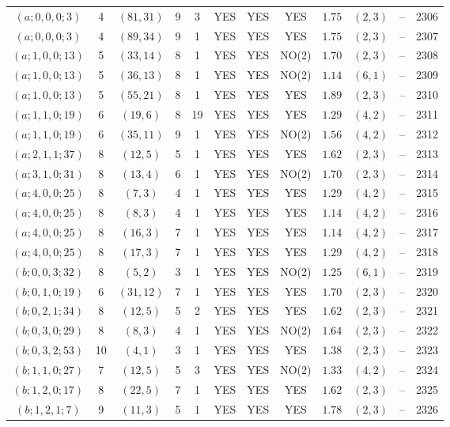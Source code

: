 \begin{longtable}{|c|c|c|c|c|c|c|c|c|c|c|c|}
$(a;0,0,0;3)$ & 4 & $(81,31)$ & 9 & 3 & YES & YES & YES & $1.75$ & $(2,3)$ & -- & 2306\\
$(a;0,0,0;3)$ & 4 & $(89,34)$ & 9 & 1 & YES & YES & YES & $1.75$ & $(2,3)$ & -- & 2307\\
$(a;1,0,0;13)$ & 5 & $(33,14)$ & 8 & 1 & YES & YES & NO(2) & $1.70$ & $(2,3)$ & -- & 2308\\
$(a;1,0,0;13)$ & 5 & $(36,13)$ & 8 & 1 & YES & YES & NO(2) & $1.14$ & $(6,1)$ & -- & 2309\\
$(a;1,0,0;13)$ & 5 & $(55,21)$ & 8 & 1 & YES & YES & YES & $1.89$ & $(2,3)$ & -- & 2310\\
$(a;1,1,0;19)$ & 6 & $(19,6)$ & 8 & 19 & YES & YES & YES & $1.29$ & $(4,2)$ & -- & 2311\\
$(a;1,1,0;19)$ & 6 & $(35,11)$ & 9 & 1 & YES & YES & NO(2) & $1.56$ & $(4,2)$ & -- & 2312\\
$(a;2,1,1;37)$ & 8 & $(12,5)$ & 5 & 1 & YES & YES & YES & $1.62$ & $(2,3)$ & -- & 2313\\
$(a;3,1,0;31)$ & 8 & $(13,4)$ & 6 & 1 & YES & YES & NO(2) & $1.70$ & $(2,3)$ & -- & 2314\\
$(a;4,0,0;25)$ & 8 & $(7,3)$ & 4 & 1 & YES & YES & YES & $1.29$ & $(4,2)$ & -- & 2315\\
$(a;4,0,0;25)$ & 8 & $(8,3)$ & 4 & 1 & YES & YES & YES & $1.14$ & $(4,2)$ & -- & 2316\\
$(a;4,0,0;25)$ & 8 & $(16,3)$ & 7 & 1 & YES & YES & YES & $1.14$ & $(4,2)$ & -- & 2317\\
$(a;4,0,0;25)$ & 8 & $(17,3)$ & 7 & 1 & YES & YES & YES & $1.29$ & $(4,2)$ & -- & 2318\\
$(b;0,0,3;32)$ & 8 & $(5,2)$ & 3 & 1 & YES & YES & NO(2) & $1.25$ & $(6,1)$ & -- & 2319\\
$(b;0,1,0;19)$ & 6 & $(31,12)$ & 7 & 1 & YES & YES & YES & $1.70$ & $(2,3)$ & -- & 2320\\
$(b;0,2,1;34)$ & 8 & $(12,5)$ & 5 & 2 & YES & YES & YES & $1.62$ & $(2,3)$ & -- & 2321\\
$(b;0,3,0;29)$ & 8 & $(8,3)$ & 4 & 1 & YES & YES & NO(2) & $1.64$ & $(2,3)$ & -- & 2322\\
$(b;0,3,2;53)$ & 10 & $(4,1)$ & 3 & 1 & YES & YES & YES & $1.38$ & $(2,3)$ & -- & 2323\\
$(b;1,1,0;27)$ & 7 & $(12,5)$ & 5 & 3 & YES & YES & NO(2) & $1.33$ & $(4,2)$ & -- & 2324\\
$(b;1,2,0;17)$ & 8 & $(22,5)$ & 7 & 1 & YES & YES & YES & $1.62$ & $(2,3)$ & -- & 2325\\
$(b;1,2,1;7)$ & 9 & $(11,3)$ & 5 & 1 & YES & YES & YES & $1.78$ & $(2,3)$ & -- & 2326\\

\end{longtable}
